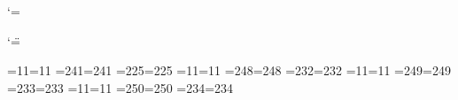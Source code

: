 \catcode`\@=\atcode		%







\def\lq{^^60}
\def\rq{^^27}


\catcode`\"=\dblcode		%




=11=11	%
=241=241
=225=225
=11=11	%
=248=248
=232=232
=11=11	%
=249=249
=233=233
=11=11	%
=250=250
=234=234

\endinput




